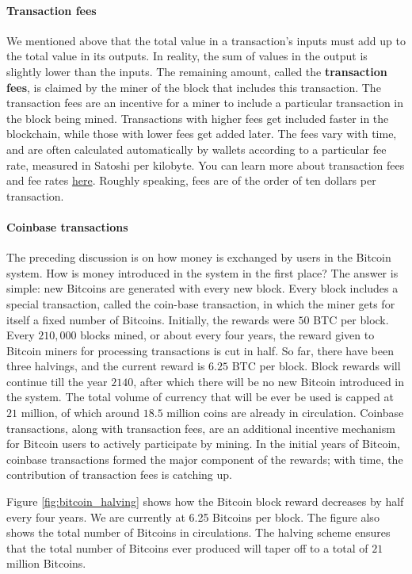 \documentclass{article}
\begin{document}
\paragraph{Transaction fees} We mentioned above that the total value in a transaction's inputs must add up to the total value in its outputs. In reality, the sum of values in the output is slightly lower than the inputs. The remaining amount, called the \textbf{transaction fees}, is claimed by the miner of the block that includes this transaction. The transaction fees are an incentive for a miner to include a particular transaction in the block being mined. Transactions with higher fees get included faster in the blockchain, while those with lower fees get added later. The fees vary with time, and are often calculated automatically by wallets according to a  particular fee rate, measured in Satoshi per kilobyte. You can learn more about transaction fees and fee rates  \href{https://en.bitcoin.it/wiki/Miner_fees}{here}. Roughly speaking, fees are of the order of ten dollars per transaction.

\paragraph*{Coinbase transactions}
The preceding discussion is on how money is exchanged by users in the Bitcoin system. How is money introduced in the system in the first place? The answer is simple: new Bitcoins are generated with every new block. Every block includes a special transaction, called the coin-base transaction, in which the miner gets for itself a fixed number of Bitcoins. Initially, the rewards were $50$ BTC per block. Every $210,000$ blocks mined, or about every four years, the reward given to Bitcoin miners for processing transactions is cut in half. So far, there have been three halvings, and the current reward is $6.25$ BTC per block. Block rewards will continue till the year $2140$, after which there will be no new Bitcoin introduced in the system. The total volume of currency that will be ever be used is capped at $21$ million, of which around $18.5$ million coins are already in circulation. Coinbase transactions, along with transaction fees, are an additional incentive mechanism for Bitcoin users to actively participate by mining. In the initial years of Bitcoin, coinbase transactions formed the major component of the rewards; with time, the contribution of transaction fees is catching up. 

Figure \ref{fig:bitcoin_halving} shows how the Bitcoin block reward decreases by half every four years. We are currently at 6.25 Bitcoins per block. The figure also shows the total number of Bitcoins in circulations. The halving scheme ensures that the total number of Bitcoins ever produced will taper off to a total of $21$ million Bitcoins.
\end{document}

